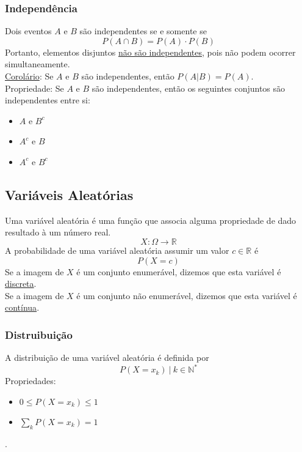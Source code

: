 \documentclass{article}
\begin{document}
\subsubsection{Independência}
Dois eventos $A$ e $B$ são independentes se e somente se
\[ P(A \cap B) = P(A) \cdot P(B) \]
Portanto, elementos disjuntos \uline{não são independentes}, pois não podem ocorrer simultaneamente. \\[10pt]
\uline{Corolário}: Se $A$ e $B$ são independentes, então $P(A|B) = P(A)$. \\[10pt]
Propriedade: Se $A$ e $B$ são independentes, então os seguintes conjuntos são independentes entre si:
\begin{itemize}
  \item $A$ e $B^c$
  \item $A^c$ e $B$
  \item $A^c$ e $B^c$
\end{itemize}


\subsection{Variáveis Aleatórias}
Uma variável aleatória é uma função que associa alguma propriedade de dado resultado à um número real.
\[ X: \Omega \to \mathbb{R} \]
A probabilidade de uma variável aleatória assumir um valor $c \in \mathbb{R}$ é
\[ P(X = c) \]
Se a imagem de $X$ é um conjunto enumerável, dizemos que esta variável é \uline{discreta}. \\[5pt]
Se a imagem de $X$ é um conjunto não enumerável, dizemos que esta variável é \uline{contínua}. \\[5pt]

\subsubsection{Distruibuição}
A distribuição de uma variável aleatória é definida por
\[ P(X = x_k) \:\big|\: k \in \mathbb{N}^* \]
Propriedades:
\begin{itemize}
  \item $0 \leq P(X = x_k) \leq 1$
  \item $\sum\limits_k P(X = x_k) = 1$
\end{itemize}
.
\end{document}
